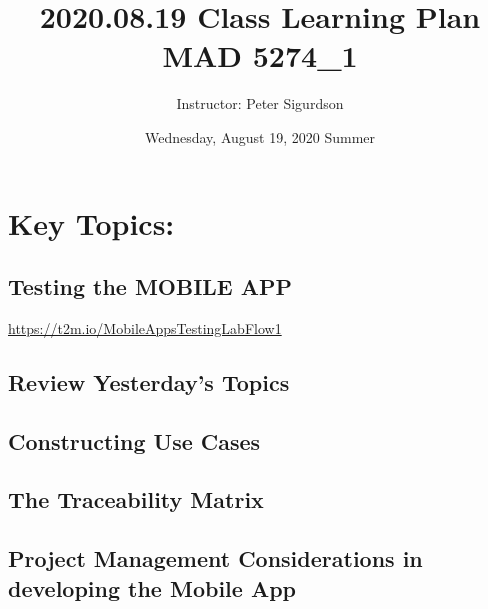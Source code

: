\documentclass{article}
\title{2020.08.19 Class Learning Plan  MAD 5274_1}
\author{Instructor: Peter Sigurdson }
\date{Wednesday, August 19, 2020 Summer}
\begin{document}
\maketitle

\section * {Key Topics:}

\subsection{Testing the MOBILE APP}
\url{https://t2m.io/MobileAppsTestingLabFlow1}

\subsection{Review Yesterday's Topics}

\subsection{Constructing Use Cases}
\subsection{The Traceability Matrix}
\subsection{Project Management Considerations in developing the Mobile App}
\end{document}
